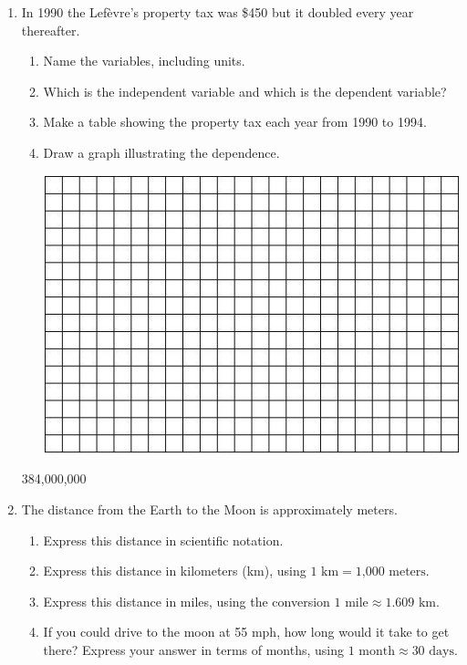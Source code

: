 \documentclass[12pt]{article}
\begin{document}
\begin{enumerate}
\item In 1990 the Lef\`evre's property tax was \$450 but it doubled every year thereafter.  
 \begin{enumerate}
 \item Name the variables, including units. \vfill \vfill
 \item Which is the independent variable and which is the dependent variable? \vfill
\item Make a table showing the property tax each year from 1990 to 1994. \vfill \vfill
\item Draw a graph illustrating the dependence.
\bigskip
\begin{center}
 {\includegraphics [width = 6in] {GraphPaper.jpg}}
\end{center}
\bigskip
 \end{enumerate} 384,000,000
 
\newpage

\item The distance from the Earth to the Moon is approximately  meters. 
\begin{enumerate}
\item Express this distance in scientific notation. \vfill
\item Express this distance in kilometers (km), using $1 \text{ km} = \text{1,000 meters}$. \vfill
\item Express this distance in miles, using the conversion $1 \text{ mile} \approx 1.609 \text{ km}$. \vfill
\item If you could drive to the moon at 55 mph, how long would it take to get there? Express your answer in terms of months, using $1 \text{ month} \approx 30 \text{ days}$. \vfill
\end{enumerate}



\end{enumerate}
\end{document}
